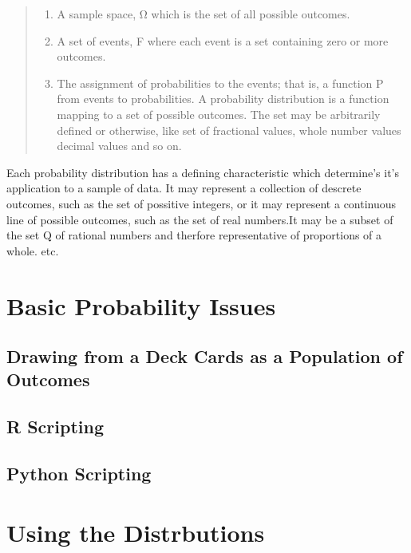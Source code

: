 \documentclass[]{book}
\providecommand{\tightlist}{%
  \setlength{\itemsep}{0pt}\setlength{\parskip}{0pt}}
\theoremstyle{definition}
\theoremstyle{definition}
\theoremstyle{definition}
\theoremstyle{remark}
\begin{document}
\begin{quote}
\begin{enumerate}
\def\labelenumi{\arabic{enumi}.}
\tightlist
\item
  A sample space, Ω which is the set of all possible outcomes.
\item
  A set of events, F where each event is a set containing zero or more
  outcomes.
\item
  The assignment of probabilities to the events; that is, a function P
  from events to probabilities.  A
  probability distribution is a function mapping to a set of possible
  outcomes. The set may be arbitrarily defined or otherwise, like set of
  fractional values, whole number values decimal values and so on.
\end{enumerate}
\end{quote}

Each probability distribution has a defining characteristic which
determine's it's application to a sample of data. It may represent a
collection of descrete outcomes, such as the set of possitive integers,
or it may represent a continuous line of possible outcomes, such as the
set of real numbers.It may be a subset of the set Q of rational numbers
and therfore representative of proportions of a whole. etc.

\section{Basic Probability Issues}\label{basic-probability-issues}

\subsection{Drawing from a Deck Cards as a Population of
Outcomes}\label{drawing-from-a-deck-cards-as-a-population-of-outcomes}

\subsection{R Scripting}\label{r-scripting-5}

\subsection{Python Scripting}\label{python-scripting-5}

\section{Using the Distrbutions}\label{using-the-distrbutions}
\end{document}
